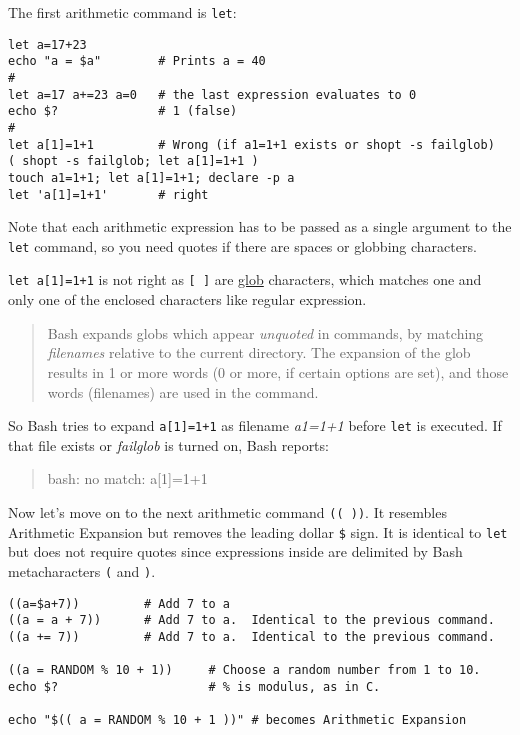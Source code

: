 The first arithmetic command is \lstinline|let|:

\begin{minipage}{1.0\linewidth}
\begin{lstlisting}
let a=17+23
echo "a = $a"        # Prints a = 40
#
let a=17 a+=23 a=0   # the last expression evaluates to 0
echo $?              # 1 (false)
#
let a[1]=1+1         # Wrong (if a1=1+1 exists or shopt -s failglob)
( shopt -s failglob; let a[1]=1+1 )
touch a1=1+1; let a[1]=1+1; declare -p a
let 'a[1]=1+1'       # right
\end{lstlisting}
\end{minipage}

Note that each arithmetic expression has to be passed as a single
argument to the \lstinline|let| command, so you need quotes if
there are spaces or globbing characters.

\lstinline/let a[1]=1+1/ is not right as \lstinline|[ ]| are
\href{http://mywiki.wooledge.org/glob}{glob} characters, which
matches one and only one of the enclosed characters like regular
expression.

\begin{quotation}
  Bash expands globs which appear \textit{unquoted} in commands,
  by matching \textit{filenames} relative to the current
  directory. The expansion of the glob results in 1 or more words
  (0 or more, if certain options are set), and those words
  (filenames) are used in the command.
\end{quotation}

So Bash tries to expand \lstinline|a[1]=1+1| as filename
\textit{a1=1+1} before \lstinline|let| is executed. If that file
exists or \textit{failglob} is turned on, Bash reports:

\begin{quotation}
  bash: no match: a[1]=1+1
\end{quotation}

Now let's move on to the next arithmetic command
\lstinline|(( ))|. It resembles Arithmetic Expansion but removes
the leading dollar
\lstinline|$| sign. It is identical to \lstinline|let| but does
not require quotes since expressions inside are delimited by
Bash metacharacters \lstinline|(| and \lstinline|)|.

\begin{lstlisting}
((a=$a+7))         # Add 7 to a
((a = a + 7))      # Add 7 to a.  Identical to the previous command.
((a += 7))         # Add 7 to a.  Identical to the previous command.

((a = RANDOM % 10 + 1))     # Choose a random number from 1 to 10.
echo $?                     # % is modulus, as in C.

echo "$(( a = RANDOM % 10 + 1 ))" # becomes Arithmetic Expansion
\end{lstlisting}

